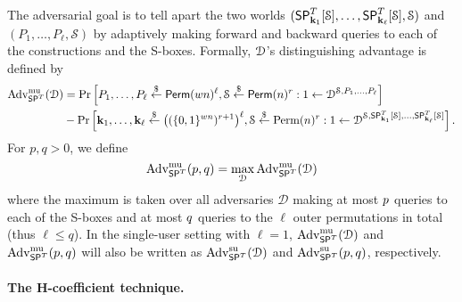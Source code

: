 \documentclass[journal=tosc,final,nohyperref]{iacrtrans}
\begin{document}
The adversarial goal is to tell apart the two worlds $(\mathsf{SP}_{\mathbf{k}_1}^T[\mathcal{S}],\ldots,\mathsf{SP}_{\mathbf{k}_\ell}^T[\mathcal{S}],\mathcal{S})$ and $({P}_1,\ldots,{P}_{\ell},\mathcal{S})$ by adaptively making forward and backward queries to each
of the constructions and the S-boxes. Formally, $\mathcal{D}$'s distinguishing advantage is
defined by
%
$$
\begin{aligned}
\operatorname{Adv}_{\mathsf{SP}^T}^{\mathrm{mu}}(\mathcal{D}) &=\operatorname{Pr}\left[{P}_1,\ldots,{P}_{\ell} \stackrel{\$}{\leftarrow} {\mathsf{Perm}}(w n)^\ell, \mathcal{S} \stackrel{\$}{\leftarrow} \mathsf{Perm}(n)^{r}: 1 \leftarrow \mathcal{D}^{\mathcal{S}, {P}_{1}, \ldots, {P}_{\ell}}\right] \\
&-\operatorname{Pr}\left[\mathbf{k}_{1}, \ldots, \mathbf{k}_{\ell} \stackrel{\$}{\leftarrow} \big((\{0,1\}^{wn})^{r+1}\big)^{\ell}, \mathcal{S} \stackrel{\$}{\leftarrow} \operatorname{Perm}(n)^{r}: 1 \leftarrow \mathcal{D}^{\mathcal{S}, \mathsf{SP}_{\mathbf{k}_{1}}^T[\mathcal{S}], \ldots, \mathsf{SP}_{\mathbf{k}_{\ell}}^T[\mathcal{S}]}\right].
\end{aligned}
$$
%
For $p,q > 0$, we define
%
$$
\operatorname{Adv}^{\mathrm{mu}}_{\mathsf{SP}^T}(p, q) = \max _{\mathcal{D}} \operatorname{Adv}^{\mathrm{mu}}_{\mathsf{SP}^T}(\mathcal{D})
$$
%
where the maximum is taken over all adversaries $\mathcal{D}$ making at most $\mathnormal{p}$ queries to each of the S-boxes and at most $\mathnormal{q}$ queries to the $\ell$ outer permutations in total (thus $\ell\leq q$). In the single-user setting with $\ell = 1$, $\operatorname{Adv}^{\mathrm{mu}}_{\mathsf{SP}^T}(\mathcal{D})$ and $\operatorname{Adv}^{\mathrm{mu}}_{\mathsf{SP}^T}(p, q)$  will also be written as $\operatorname{Adv}^{\mathrm{su}}_{\mathsf{SP}^T}(\mathcal{D})$ and $\operatorname{Adv}^{\mathrm{su}}_{\mathsf{SP}^T}(p, q)$, respectively.






%

\paragraph{The H-coefficient technique.}
\end{document}
